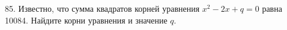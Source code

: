 85. Известно, что сумма квадратов корней уравнения $x^2-2x + q = 0$ равна 10084.
Найдите корни уравнения и значение $q.$\\
